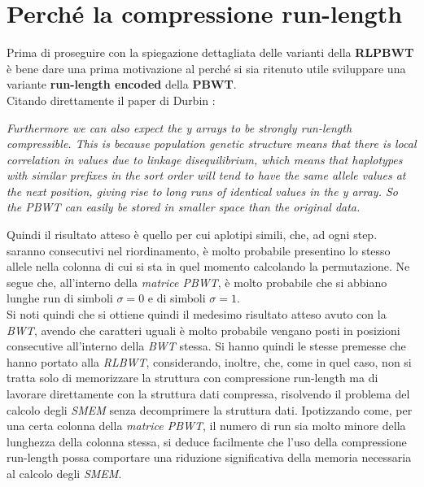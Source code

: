 \section{Perché la compressione run-length}
Prima di proseguire con la spiegazione dettagliata delle varianti della
\textbf{RLPBWT} è bene dare 
una prima motivazione al perché si sia ritenuto utile sviluppare una variante
\textbf{run-length encoded} della \textbf{PBWT}.\\
Citando direttamente il paper di Durbin \cite{pbwt}:
\begin{center}
  \textit{Furthermore we can also expect the y arrays to be strongly run-length
    compressible. This is because population genetic structure means that there
    is local correlation in values due to linkage disequilibrium, which means
    that haplotypes with similar prefixes in the sort order will tend to have
    the same allele values at the next position, giving rise to long runs of
    identical values in the y array. So the PBWT can easily be stored in smaller
    space than the original data.} 
\end{center}
Quindi il risultato atteso è quello per cui aplotipi simili, che, ad ogni step.
saranno consecutivi nel riordinamento, è molto probabile presentino lo stesso
allele nella colonna di cui si sta in quel momento calcolando la
permutazione. Ne segue che, all'interno della \textit{matrice PBWT}, è molto
probabile che si abbiano lunghe run di simboli $\sigma=0$ e di simboli
$\sigma=1$.\\ 
Si noti quindi che si ottiene quindi il medesimo risultato atteso avuto con
la \textit{BWT}, avendo che caratteri uguali è molto probabile vengano posti in
posizioni consecutive all'interno della \textit{BWT} stessa. Si hanno quindi le
stesse premesse che hanno portato alla \textit{RLBWT}, considerando, inoltre,
che,
come in quel caso, non si tratta solo di memorizzare la struttura con
compressione run-length ma di lavorare direttamente con la struttura dati
compressa, risolvendo il problema del calcolo degli \textit{SMEM} senza
decomprimere la struttura dati. Ipotizzando come, per una certa colonna della
\textit{matrice PBWT}, il numero di run sia molto minore della lunghezza della
colonna stessa, si deduce facilmente che l'uso della compressione run-length
possa comportare una riduzione significativa della memoria necessaria al calcolo
degli \textit{SMEM}.
